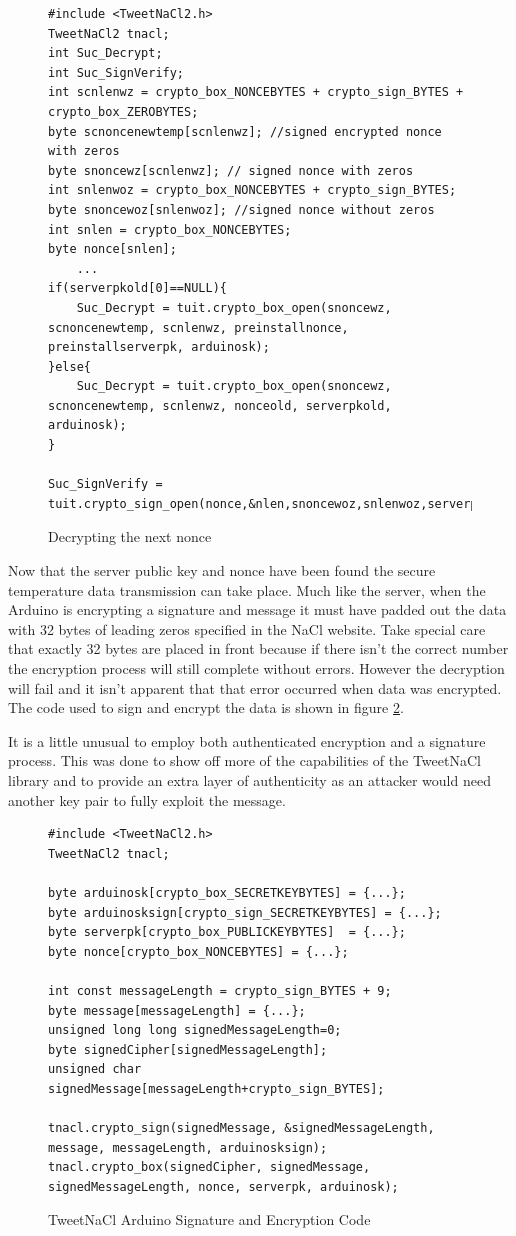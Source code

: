\begin{figure}[H]
\begin{lstlisting}[style=Arduino]
#include <TweetNaCl2.h>
TweetNaCl2 tnacl;
int Suc_Decrypt;
int Suc_SignVerify;
int scnlenwz = crypto_box_NONCEBYTES + crypto_sign_BYTES + crypto_box_ZEROBYTES; 
byte scnoncenewtemp[scnlenwz]; //signed encrypted nonce with zeros
byte snoncewz[scnlenwz]; // signed nonce with zeros
int snlenwoz = crypto_box_NONCEBYTES + crypto_sign_BYTES;
byte snoncewoz[snlenwoz]; //signed nonce without zeros
int snlen = crypto_box_NONCEBYTES;
byte nonce[snlen];
	...
if(serverpkold[0]==NULL){
	Suc_Decrypt = tuit.crypto_box_open(snoncewz, scnoncenewtemp, scnlenwz, preinstallnonce, preinstallserverpk, arduinosk); 
}else{
	Suc_Decrypt = tuit.crypto_box_open(snoncewz, scnoncenewtemp, scnlenwz, nonceold, serverpkold, arduinosk);
}

Suc_SignVerify = tuit.crypto_sign_open(nonce,&nlen,snoncewoz,snlenwoz,serverpksign);

\end{lstlisting}
\caption{Decrypting the next nonce}
\label{snip:denonce}
\end{figure}

Now that the server public key and nonce have been found the secure temperature data transmission can take place. Much like the server, when the Arduino is encrypting a signature and message it must have padded out the data with 32 bytes of leading zeros specified in the NaCl website. Take special care that exactly 32 bytes are placed in front because if there isn't the correct number the encryption process will still complete without errors. However the decryption will fail and it isn't apparent that that error occurred when data was encrypted. The code used to sign and encrypt the data is shown in figure \ref{snip:nacl}.

It is a little unusual to employ both authenticated encryption and a signature process. This was done to show off more of the capabilities of the TweetNaCl library and to provide an extra layer of authenticity as an attacker would need another key pair to fully exploit the message.

\begin{figure}[H]
\begin{lstlisting}[style=Arduino]
#include <TweetNaCl2.h>
TweetNaCl2 tnacl;

byte arduinosk[crypto_box_SECRETKEYBYTES] = {...};
byte arduinosksign[crypto_sign_SECRETKEYBYTES] = {...};
byte serverpk[crypto_box_PUBLICKEYBYTES]  = {...};
byte nonce[crypto_box_NONCEBYTES] = {...};

int const messageLength = crypto_sign_BYTES + 9;
byte message[messageLength] = {...};
unsigned long long signedMessageLength=0;
byte signedCipher[signedMessageLength];
unsigned char signedMessage[messageLength+crypto_sign_BYTES];

tnacl.crypto_sign(signedMessage, &signedMessageLength, message, messageLength, arduinosksign);
tnacl.crypto_box(signedCipher, signedMessage, signedMessageLength, nonce, serverpk, arduinosk);
\end{lstlisting}
\caption{TweetNaCl Arduino Signature and Encryption Code}
\label{snip:nacl}
\end{figure}

